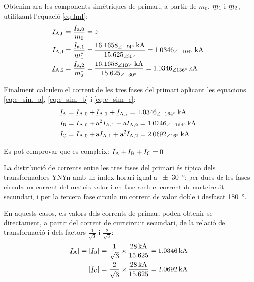 \begin{exemple}
    Obtenim ara les components simètriques de primari, a partir de $m_0$, $\cmplx{m}_1$ i $\cmplx{m}_2$, utilitzant l'equació \eqref{eq:ImI}:
    \begin{align*}
        \cmplx{I}\ped{A,0} &= \frac{\cmplx{I}\ped{a,0}}{m_0} = 0 \\
        \cmplx{I}\ped{A,1} &= \frac{\cmplx{I}\ped{a,1}}{\cmplx{m}^*_1} = \frac{\SIpd{16,1658}{-74}{kA}}{\numpd{15,625}{30}} =  \SIpd{1,0346}{-104}{kA} \\
        \cmplx{I}\ped{A,2} &= \frac{\cmplx{I}\ped{a,2}}{\cmplx{m}^*_2} = \frac{\SIpd{16,1658}{106}{kA}}{\numpd{15,625}{-30}} = \SIpd{1,0346}{136}{kA}
    \end{align*}

    Finalment calculem el corrent de les tres fases del primari aplicant les equacions \eqref{eq:c_sim_a}, \eqref{eq:c_sim_b} i \eqref{eq:c_sim_c}:
     \begin{align*}
        \cmplx{I}\ped{A} &= \cmplx{I}\ped{A,0} + \cmplx{I}\ped{A,1} + \cmplx{I}\ped{A,2} = \SIpd{1,0346}{-164}{kA} \\
        \cmplx{I}\ped{B} &= \cmplx{I}\ped{A,0} + \au^2 \cmplx{I}\ped{A,1} + \au \cmplx{I}\ped{A,2} = \SIpd{1,0346}{-164}{kA} \\
        \cmplx{I}\ped{C} &= \cmplx{I}\ped{A,0} + \au \cmplx{I}\ped{A,1} + \au^2 \cmplx{I}\ped{A,2} = \SIpd{2,0692}{16}{kA}
    \end{align*}

    Es pot comprovar que es compleix: $\cmplx{I}\ped{A} + \cmplx{I}\ped{B} + \cmplx{I}\ped{C} = 0$

    La distribució de corrents entre les tres fases del primari és típica dels transformadors YNYn amb un índex horari igual a \SI{+-30}{\degree}; per dues de les fases circula un corrent del mateix valor  i en fase amb el corrent de curtcircuit secundari, i per la tercera fase circula un corrent de valor doble i desfasat \SI{180}{\degree}.

     En aquests casos, els valors dels corrents de primari poden obtenir-se directament, a partir del corrent de curtcircuit secundari, de la relació de transformació i dels factors $\frac{1}{\sqrt{3}}$ i  $\frac{2}{\sqrt{3}}$:
    \begin{align*}
        |\cmplx{I}\ped{A}| = |\cmplx{I}\ped{B}| = \frac{1}{\sqrt{3}} \times \frac{\SI{28}{kA}}{\num{15,625}} = \SI{1,0346}{kA} \\
        |\cmplx{I}\ped{C}|= \frac{2}{\sqrt{3}} \times \frac{\SI{28}{kA}}{\num{15,625}} = \SI{2,0692}{kA}
    \end{align*}

\end{exemple}



